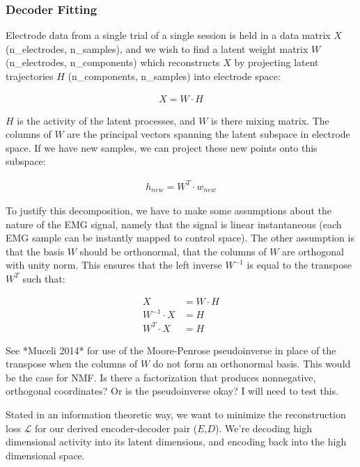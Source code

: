 \documentclass[../main.tex]{subfiles}
\begin{document}
\subsubsection{Decoder Fitting}

Electrode data from a single trial of a single session is held in a data matrix $X$ (n\_electrodes, n\_samples), and we wish to find a latent weight matrix $W$ (n\_electrodes, n\_components) which reconstructs $X$ by projecting latent trajectories $H$ (n\_components, n\_samples) into electrode space:

\begin{align*}
X = W\cdot{H}
\end{align*}

$H$ is the activity of the latent processes, and $W$ is there mixing matrix. The columns of $W$ are the principal vectors spanning the latent subspace in electrode space. If we have new samples, we can project these new points onto this subspace:

\begin{align*}
h_{new} = W^T\cdot{w_{new}}
\end{align*}

To justify this decomposition, we have to make some assumptions about the nature of the EMG signal, namely that the signal is linear instantaneous (each EMG sample can be instantly mapped to control space). The other assumption is that the basis $W$ should be orthonormal, that the columns of $W$ are orthogonal with unity norm. This ensures that the left inverse $W^{-1}$ is equal to the transpose $W^T$ such that:

\begin{align*}
X &= W\cdot{H} \\
W^{-1}\cdot{X} &= {H} \\
W^{T}\cdot{X} &= {H}
\end{align*}

See *Muceli 2014* for use of the Moore-Penrose pseudoinverse in place of the transpose when the columns of $W$ do not form an orthonormal basis. This would be the case for NMF. Is there a factorization that produces nonnegative, orthogonal coordinates? Or is the pseudoinverse okay? I will need to test this.

Stated in an information theoretic way, we want to minimize the reconstruction loss $\mathcal{L}$ for our derived encoder-decoder pair ($E$,$D$). We're decoding high dimensional activity into its latent dimensions, and encoding back into the high dimensional space.
\end{document}
